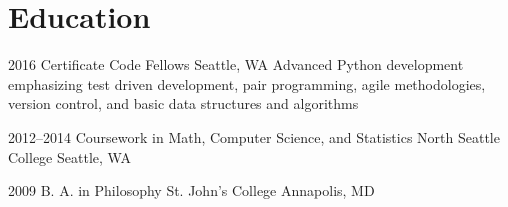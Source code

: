 \documentclass[10pt,a4paper,sans]{moderncv}        %
\begin{document}
\section{Education}
\cventry
{2016}
{Certificate}
{Code Fellows}
{Seattle, WA}
{}
{Advanced Python development emphasizing test driven development, pair
  programming, agile methodologies, version control, and basic data structures
  and algorithms}

\cventry
{2012--2014}
{Coursework in Math, Computer Science, and Statistics}
{North Seattle College}
{Seattle, WA}
{}
{}

\cventry
{2009}
{B. A. in Philosophy}
{St. John's College}
{Annapolis, MD}
{}
{}
\end{document}
